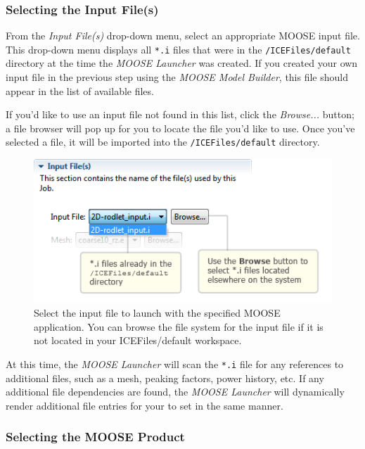 \subsubsection{Selecting the Input
File(s)}\label{selecting-the-input-files}

From the \emph{Input File(s)} drop-down menu, select an appropriate
MOOSE input file. This drop-down menu displays all \texttt{*.i} files
that were in the \texttt{/ICEFiles/default} directory at the time the
\emph{MOOSE Launcher} was created. If you created your own input file in
the previous step using the \emph{MOOSE Model Builder}, this file should
appear in the list of available files.

If you'd like to use an input file not found in this list, click the
\emph{Browse...} button; a file browser will pop up for you to locate
the file you'd like to use. Once you've selected a file, it will be
imported into the \texttt{/ICEFiles/default} directory.

\begin{figure}[htbp]
\begin{center}
\includegraphics[scale=.6]{figures/ICE_MOOSEInputFiles.png}
\caption{Select the input file to launch with the specified MOOSE application. You can browse the file system for the input file if it is not located in your ICEFiles/default workspace.}
\end{center}
\end{figure}

At this time, the \emph{MOOSE Launcher} will scan the \texttt{*.i} file
for any references to additional files, such as a mesh, peaking factors,
power history, etc. If any additional file dependencies are found, the
\emph{MOOSE Launcher} will dynamically render additional file entries
for your to set in the same manner.

\subsubsection{Selecting the MOOSE
Product}\label{selecting-the-moose-product}

